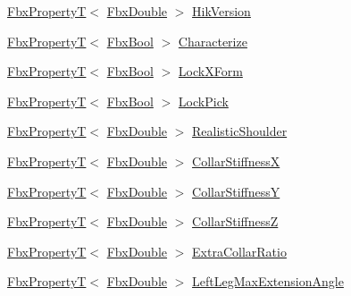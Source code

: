 \begin{DoxyCompactItemize}
\item 
\hyperlink{class_fbx_property_t}{Fbx\+PropertyT}$<$ \hyperlink{fbxtypes_8h_a171e72a1c46fc15c1a6c9c31948c1c5b}{Fbx\+Double} $>$ \hyperlink{class_fbx_character_a8a71e81731d16cc1d217a44125775047}{Hik\+Version}
\item 
\hyperlink{class_fbx_property_t}{Fbx\+PropertyT}$<$ \hyperlink{fbxtypes_8h_a92e0562b2fe33e76a242f498b362262e}{Fbx\+Bool} $>$ \hyperlink{class_fbx_character_aba95c8944cb952c7e5dd0e3ceaba2bb3}{Characterize}
\item 
\hyperlink{class_fbx_property_t}{Fbx\+PropertyT}$<$ \hyperlink{fbxtypes_8h_a92e0562b2fe33e76a242f498b362262e}{Fbx\+Bool} $>$ \hyperlink{class_fbx_character_a76c5887a0ed952165cca32f065d2899c}{Lock\+X\+Form}
\item 
\hyperlink{class_fbx_property_t}{Fbx\+PropertyT}$<$ \hyperlink{fbxtypes_8h_a92e0562b2fe33e76a242f498b362262e}{Fbx\+Bool} $>$ \hyperlink{class_fbx_character_aebb6c968bc52b7fa922f7b16b7161ac6}{Lock\+Pick}
\item 
\hyperlink{class_fbx_property_t}{Fbx\+PropertyT}$<$ \hyperlink{fbxtypes_8h_a171e72a1c46fc15c1a6c9c31948c1c5b}{Fbx\+Double} $>$ \hyperlink{class_fbx_character_a594b9348cd768b365f2fd7efce2370ba}{Realistic\+Shoulder}
\item 
\hyperlink{class_fbx_property_t}{Fbx\+PropertyT}$<$ \hyperlink{fbxtypes_8h_a171e72a1c46fc15c1a6c9c31948c1c5b}{Fbx\+Double} $>$ \hyperlink{class_fbx_character_a02276549abd3825a728faf703dc76cc7}{Collar\+StiffnessX}
\item 
\hyperlink{class_fbx_property_t}{Fbx\+PropertyT}$<$ \hyperlink{fbxtypes_8h_a171e72a1c46fc15c1a6c9c31948c1c5b}{Fbx\+Double} $>$ \hyperlink{class_fbx_character_a13377b6a419571905e106f44f31c7c8e}{Collar\+StiffnessY}
\item 
\hyperlink{class_fbx_property_t}{Fbx\+PropertyT}$<$ \hyperlink{fbxtypes_8h_a171e72a1c46fc15c1a6c9c31948c1c5b}{Fbx\+Double} $>$ \hyperlink{class_fbx_character_aed64ee1f0b716afbaba511e81fbcaf8d}{Collar\+StiffnessZ}
\item 
\hyperlink{class_fbx_property_t}{Fbx\+PropertyT}$<$ \hyperlink{fbxtypes_8h_a171e72a1c46fc15c1a6c9c31948c1c5b}{Fbx\+Double} $>$ \hyperlink{class_fbx_character_a49b43a339e47ff3366081d5743f30d38}{Extra\+Collar\+Ratio}
\item 
\hyperlink{class_fbx_property_t}{Fbx\+PropertyT}$<$ \hyperlink{fbxtypes_8h_a171e72a1c46fc15c1a6c9c31948c1c5b}{Fbx\+Double} $>$ \hyperlink{class_fbx_character_a27fc895d26ff251bc59c9758aef2e03f}{Left\+Leg\+Max\+Extension\+Angle}
\item 

\end{DoxyCompactItemize}

